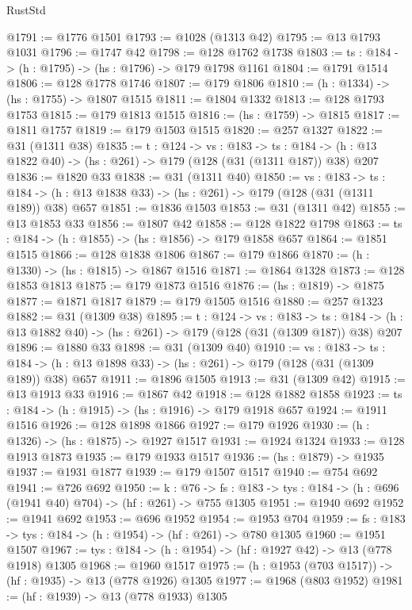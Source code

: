 \begin{lexlean}{RustStd}
\begin{coremodule}
{\begin{coremodule}
{{{{{@1791 := @1776 @1501
@1793 := @1028 (@1313 @42)
@1795 := @13 @1793 @1031
@1796 := @1747 @42
@1798 := @128 @1762 @1738
@1803 := {ts : @184} -> (h : @1795) -> (hs : @1796) -> @179 @1798 @1161
@1804 := @1791 @1514
@1806 := @128 @1778 @1746
@1807 := @179 @1806
@1810 := (h : @1334) -> (hs : @1755) -> @1807 @1515
@1811 := @1804 @1332
@1813 := @128 @1793 @1753
@1815 := @179 @1813 @1515
@1816 := (hs : @1759) -> @1815
@1817 := @1811 @1757
@1819 := @179 @1503 @1515
@1820 := @257 @1327
@1822 := @31 (@1311 @38)
@1835 := {t : @124} ->
  {vs : @183} ->
  {ts : @184} -> (h : @13 @1822 @40) -> (hs : @261) -> @179 (@128 (@31 (@1311 @187)) @38) @207
@1836 := @1820 @33
@1838 := @31 (@1311 @40)
@1850 := {vs : @183} ->
  {ts : @184} -> (h : @13 @1838 @33) -> (hs : @261) -> @179 (@128 (@31 (@1311 @189)) @38) @657
@1851 := @1836 @1503
@1853 := @31 (@1311 @42)
@1855 := @13 @1853 @33
@1856 := @1807 @42
@1858 := @128 @1822 @1798
@1863 := {ts : @184} -> (h : @1855) -> (hs : @1856) -> @179 @1858 @657
@1864 := @1851 @1515
@1866 := @128 @1838 @1806
@1867 := @179 @1866
@1870 := (h : @1330) -> (hs : @1815) -> @1867 @1516
@1871 := @1864 @1328
@1873 := @128 @1853 @1813
@1875 := @179 @1873 @1516
@1876 := (hs : @1819) -> @1875
@1877 := @1871 @1817
@1879 := @179 @1505 @1516
@1880 := @257 @1323
@1882 := @31 (@1309 @38)
@1895 := {t : @124} ->
  {vs : @183} ->
  {ts : @184} -> (h : @13 @1882 @40) -> (hs : @261) -> @179 (@128 (@31 (@1309 @187)) @38) @207
@1896 := @1880 @33
@1898 := @31 (@1309 @40)
@1910 := {vs : @183} ->
  {ts : @184} -> (h : @13 @1898 @33) -> (hs : @261) -> @179 (@128 (@31 (@1309 @189)) @38) @657
@1911 := @1896 @1505
@1913 := @31 (@1309 @42)
@1915 := @13 @1913 @33
@1916 := @1867 @42
@1918 := @128 @1882 @1858
@1923 := {ts : @184} -> (h : @1915) -> (hs : @1916) -> @179 @1918 @657
@1924 := @1911 @1516
@1926 := @128 @1898 @1866
@1927 := @179 @1926
@1930 := (h : @1326) -> (hs : @1875) -> @1927 @1517
@1931 := @1924 @1324
@1933 := @128 @1913 @1873
@1935 := @179 @1933 @1517
@1936 := (hs : @1879) -> @1935
@1937 := @1931 @1877
@1939 := @179 @1507 @1517
@1940 := @754 @692
@1941 := @726 @692
@1950 := {k : @76} ->
  {fs : @183} -> {tys : @184} -> (h : @696 (@1941 @40) @704) -> (hf : @261) -> @755 @1305
@1951 := @1940 @692
@1952 := @1941 @692
@1953 := @696 @1952
@1954 := @1953 @704
@1959 := {fs : @183} -> {tys : @184} -> (h : @1954) -> (hf : @261) -> @780 @1305
@1960 := @1951 @1507
@1967 := {tys : @184} -> (h : @1954) -> (hf : @1927 @42) -> @13 (@778 @1918) @1305
@1968 := @1960 @1517
@1975 := (h : @1953 (@703 @1517)) -> (hf : @1935) -> @13 (@778 @1926) @1305
@1977 := @1968 (@803 @1952)
@1981 := (hf : @1939) -> @13 (@778 @1933) @1305
}}}}}
\end{coremodule}}
\end{coremodule}
\end{lexlean}
